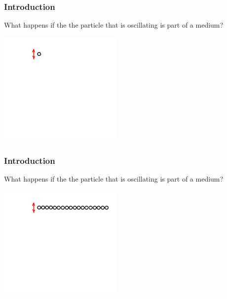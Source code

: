 \documentclass[]{beamer}
\begin{document}


\begin{frame}
\frametitle{Introduction}

What happens if the the particle that is oscillating is part of a medium? 

\begin{center}
  \includegraphics[height=2.2in]{images4/0b.jpg}
\end{center}

  \end{frame}


\begin{frame}
\frametitle{Introduction}

What happens if the the particle that is oscillating is part of a medium? 

\begin{center}
  \includegraphics[height=2.2in]{images4/0c.jpg}
\end{center}

  \end{frame}
\end{document}
